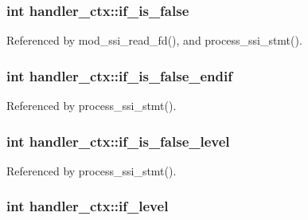 \hypertarget{structhandler__ctx_ad6d0498d59395fecd55e1390c771d851}{
\subsubsection[{if\-\_\-is\-\_\-false}]{\setlength{\rightskip}{0pt plus 5cm}int handler\-\_\-ctx\-::if\-\_\-is\-\_\-false}}\label{structhandler__ctx_ad6d0498d59395fecd55e1390c771d851}


Referenced by mod\-\_\-ssi\-\_\-read\-\_\-fd(), and process\-\_\-ssi\-\_\-stmt().

\hypertarget{structhandler__ctx_af6890f2bbf1f9f5e4aab68efba0f0cb2}{
\subsubsection[{if\-\_\-is\-\_\-false\-\_\-endif}]{\setlength{\rightskip}{0pt plus 5cm}int handler\-\_\-ctx\-::if\-\_\-is\-\_\-false\-\_\-endif}}\label{structhandler__ctx_af6890f2bbf1f9f5e4aab68efba0f0cb2}


Referenced by process\-\_\-ssi\-\_\-stmt().

\hypertarget{structhandler__ctx_a6c521a4000520e16da5c01e15d113df1}{
\subsubsection[{if\-\_\-is\-\_\-false\-\_\-level}]{\setlength{\rightskip}{0pt plus 5cm}int handler\-\_\-ctx\-::if\-\_\-is\-\_\-false\-\_\-level}}\label{structhandler__ctx_a6c521a4000520e16da5c01e15d113df1}


Referenced by process\-\_\-ssi\-\_\-stmt().

\hypertarget{structhandler__ctx_a668a96408a12ccc692848f17b829397e}{
\subsubsection[{if\-\_\-level}]{\setlength{\rightskip}{0pt plus 5cm}int handler\-\_\-ctx\-::if\-\_\-level}}\label{structhandler__ctx_a668a96408a12ccc692848f17b829397e}


